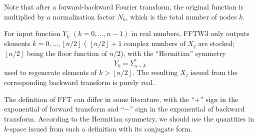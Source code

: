 Note that after a forward-backward Fourier transform, the original
function is multiplied by a normalization factor $N_{k}$, which is
the total number of nodes $k$.

For input function $Y_{k}$ $(k=0,\ldots,n-1)$ in real numbers, FFTW3
only outputs elements $k=0,\ldots,\left\lfloor n/2\right\rfloor $
( $\left\lfloor n/2\right\rfloor +1$ complex numbers of $X_{j}$
are stocked; $\left\lfloor n/2\right\rfloor $ being the floor function
of $n/2$), with the “Hermitian” symmetry
\begin{equation}
Y_{k}=Y_{n-k}^{*}\label{eq:yk_conjg}
\end{equation}
used to regenerate elements of $k>\left\lfloor n/2\right\rfloor $.
The resulting $X_{j}$ issued from the corresponding backward transform
is purely real. 

The definition of \acs{FFT} can differ in some literature, with
the ``$+$'' sign in the exponential of forward transform and ``$-$''
sign in the exponential of backward transform. According to the Hermitian
symmetry, we should use the quantities in $k$-space issued from such
a definition with its conjugate form.
